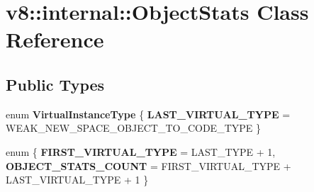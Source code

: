 \hypertarget{classv8_1_1internal_1_1ObjectStats}{}\section{v8\+:\+:internal\+:\+:Object\+Stats Class Reference}
\label{classv8_1_1internal_1_1ObjectStats}
\subsection*{Public Types}
\begin{DoxyCompactItemize}
\item 
\mbox{\label{classv8_1_1internal_1_1ObjectStats_af126327fac2128439af512ada2dca996}} 
enum {\bfseries Virtual\+Instance\+Type} \{ {\bfseries L\+A\+S\+T\+\_\+\+V\+I\+R\+T\+U\+A\+L\+\_\+\+T\+Y\+PE} = W\+E\+A\+K\+\_\+\+N\+E\+W\+\_\+\+S\+P\+A\+C\+E\+\_\+\+O\+B\+J\+E\+C\+T\+\_\+\+T\+O\+\_\+\+C\+O\+D\+E\+\_\+\+T\+Y\+PE
 \}
\item 
\mbox{\label{classv8_1_1internal_1_1ObjectStats_a4abd736f2e6be7d5ecf917baf890774d}} 
enum \{ {\bfseries F\+I\+R\+S\+T\+\_\+\+V\+I\+R\+T\+U\+A\+L\+\_\+\+T\+Y\+PE} = L\+A\+S\+T\+\_\+\+T\+Y\+PE + 1, 
{\bfseries O\+B\+J\+E\+C\+T\+\_\+\+S\+T\+A\+T\+S\+\_\+\+C\+O\+U\+NT} = F\+I\+R\+S\+T\+\_\+\+V\+I\+R\+T\+U\+A\+L\+\_\+\+T\+Y\+PE + L\+A\+S\+T\+\_\+\+V\+I\+R\+T\+U\+A\+L\+\_\+\+T\+Y\+PE + 1
 \}
\end{DoxyCompactItemize}
